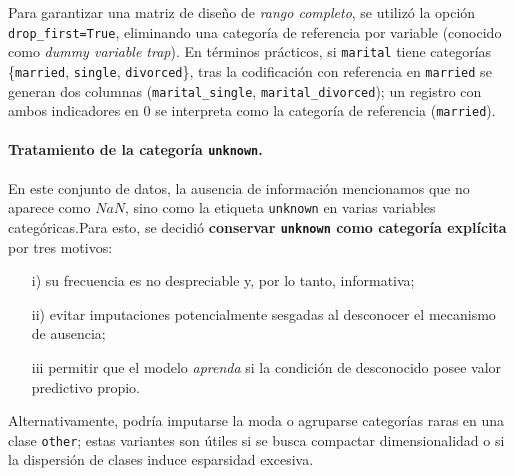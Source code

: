 \documentclass[10pt]{article}
\begin{document}
Para garantizar una matriz de diseño de \emph{rango completo}, se utilizó la opción \texttt{drop\_first=True}, eliminando una categoría de referencia por variable (conocido como \emph{dummy variable trap}). En términos prácticos, si \texttt{marital} tiene categorías \{\texttt{married}, \texttt{single}, \texttt{divorced}\}, tras la codificación con referencia en \texttt{married} se generan dos columnas (\texttt{marital\_single}, \texttt{marital\_divorced}); un registro con ambos indicadores en \(0\) se interpreta como la categoría de referencia (\texttt{married}). 

\paragraph{Tratamiento de la categoría \texttt{unknown}.}
En este conjunto de datos, la ausencia de información mencionamos que no aparece como \(NaN\), sino como la etiqueta \texttt{unknown} en varias variables categóricas.Para esto, se decidió \textbf{conservar \texttt{unknown} como categoría explícita} por tres motivos:
\begin{itemize}
    \item[i)]su frecuencia es no despreciable y, por lo tanto, informativa; 
    \item[ii)] evitar imputaciones potencialmente sesgadas al desconocer el mecanismo de ausencia; 
    \item[iii] permitir que el modelo \emph{aprenda} si la condición de desconocido posee valor predictivo propio. 
\end{itemize}
Alternativamente, podría imputarse la moda o agruparse categorías raras en una clase \texttt{other}; estas variantes son útiles si se busca compactar dimensionalidad o si la dispersión de clases induce esparsidad excesiva.
\end{document}
